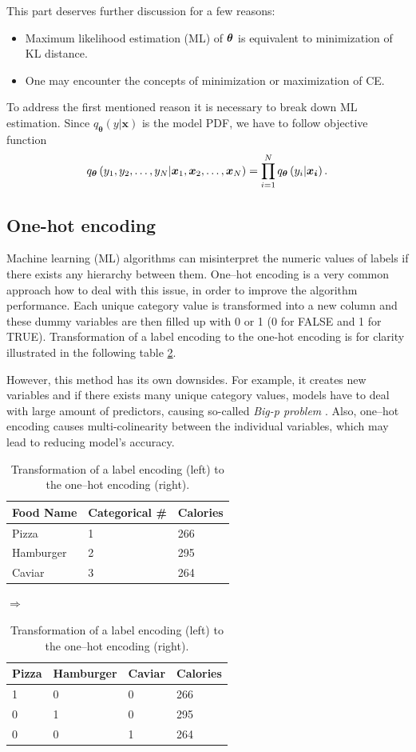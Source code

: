 This part deserves further discussion for a few reasons:
\begin{itemize}
    \item Maximum likelihood estimation (ML) of $\boldsymbol{\theta}$ is equivalent to minimization of KL distance.
    \item One may encounter the concepts of minimization or maximization of CE.
\end{itemize}
To address the first mentioned reason it is necessary to break down ML estimation. Since $q_{\boldsymbol{\theta}}\left(y|\boldsymbol{x}\right)$ is the model PDF, we have to follow objective function
\begin{equation}
    q_{\boldsymbol{\theta}}\left(y_1,y_2,\dots,y_N|\boldsymbol{x}_1, \boldsymbol{x}_2, \dots, \boldsymbol{x}_N\right) = \prod_{i=1}^{N}q_{\boldsymbol{\theta}}\left(y_i|\boldsymbol{x_i}\right).
\end{equation}


\subsection{One-hot encoding}\label{OHE}
 Machine learning (ML) algorithms can misinterpret the numeric values of labels if there exists any hierarchy between them. One--hot encoding is a very common approach how to deal with this issue, in order to improve the algorithm performance. Each unique category value is transformed into a new column and these dummy variables are then filled up with 0 or 1 (0 for FALSE and 1 for TRUE). Transformation of a label encoding to the one-hot encoding is for clarity illustrated in the following table \ref{tab:OHE}. 
 
 However, this method has its own downsides. For example, it creates new variables and if there exists many unique category values, models have to deal with large amount of predictors, causing so-called \emph{Big-p problem} \cite{Bigp}. Also, one--hot encoding causes multi-colinearity between the individual variables, which may lead to reducing model's accuracy. 
 \begin{table}[h]
 \centering
 	\begin{tabular}{|l|l|l|}
 		\hline
 		Food Name & Categorical \# & Calories \\ \hline
 		Pizza     & 1              & 266      \\ \hline
 		Hamburger & 2              & 295      \\ \hline
 		Caviar    & 3              & 264      \\ \hline
 	\end{tabular}
 	\quad $\Rightarrow$ \quad
	\begin{tabular}{|l|l|l|l|}
		\hline
		Pizza & Hamburger & Caviar & Calories \\ \hline
		1     & 0         & 0      & 266      \\ \hline
		0     & 1         & 0      & 295      \\ \hline
		0     & 0         & 1      & 264      \\ \hline
	\end{tabular}
	\caption{Transformation of a label encoding (left) to the one--hot encoding (right).}
	\label{tab:OHE}
 \end{table}
